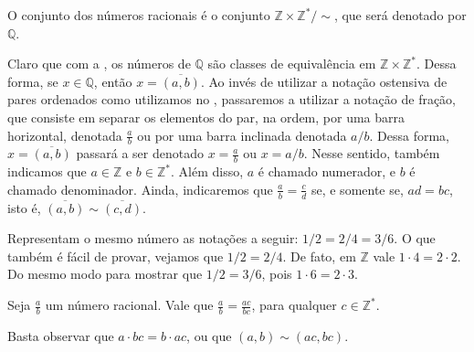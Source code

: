 \documentclass[../main.tex]{subfiles}
\begin{document}
\begin{defi}\label{rac-def-conjuntoQ}
   O conjunto dos números racionais é o conjunto $\mathbb{Z} \times \mathbb{Z}^* / \sim$, que será denotado por $\mathbb{Q}$.
\end{defi}
Claro que com a , os números de $\mathbb{Q}$ são classes de equivalência em $\mathbb{Z} \times \mathbb{Z}^*$.
Dessa forma, se $x \in \mathbb{Q}$, então $x = \overline{(a,b)}$. Ao invés de utilizar a notação ostensiva de pares ordenados como utilizamos no , passaremos a utilizar a notação de fração, que consiste em separar os elementos do par, na ordem, por uma barra horizontal, denotada $\frac{a}{b}$ ou por uma barra inclinada denotada $a/b$. Dessa forma, $x = \overline{(a,b)}$ passará a ser denotado $x = \frac{a}{b}$ ou $x = a/b$. Nesse sentido, também indicamos que $a \in \mathbb{Z}$ e $b \in \mathbb{Z}^*$. Além disso, $a$ é chamado numerador, e $b$ é chamado denominador. Ainda, indicaremos que $\frac{a}{b} = \frac{c}{d}$ se, e somente se, $ad = bc$, isto é, $\overline{(a,b)} \sim \overline{(c,d)}$.

\begin{ex}
    Representam o mesmo número as notações a seguir: $1/2 =  2/4 = 3/6$. O que também é fácil de provar, vejamos que $1/2 =  2/4$. De fato, em $\mathbb{Z}$ vale $1 \cdot 4 = 2 \cdot 2$. Do mesmo modo para mostrar que $1/2 = 3/6$, pois $1 \cdot 6 = 2 \cdot 3$.
\end{ex}

\begin{prop}\label{rac-prop-cancelarFatorComumNumeradorDenominador}
    Seja $\frac{a}{b}$ um número racional. Vale que $ \frac{a}{b} = \frac{ac}{bc}$, para qualquer $c \in \mathbb{Z}^*$.
\end{prop}
\begin{dem}
    Basta observar que $a \cdot bc = b \cdot ac$, ou que $(a,b) \sim (ac,bc)$.
\end{dem}

\end{document}
